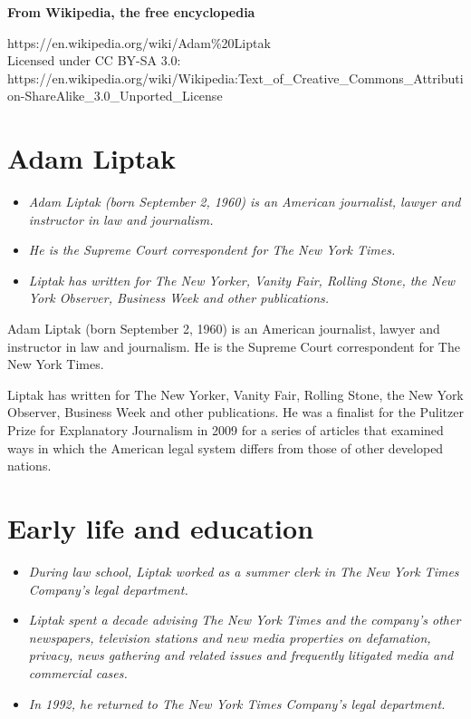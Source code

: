 \textbf{From Wikipedia, the free encyclopedia}

https://en.wikipedia.org/wiki/Adam\%20Liptak\\
Licensed under CC BY-SA 3.0:\\
https://en.wikipedia.org/wiki/Wikipedia:Text\_of\_Creative\_Commons\_Attribution-ShareAlike\_3.0\_Unported\_License

\section{Adam Liptak}\label{adam-liptak}

\begin{itemize}
\item
  \emph{Adam Liptak (born September 2, 1960) is an American journalist,
  lawyer and instructor in law and journalism.}
\item
  \emph{He is the Supreme Court correspondent for The New York Times.}
\item
  \emph{Liptak has written for The New Yorker, Vanity Fair, Rolling
  Stone, the New York Observer, Business Week and other publications.}
\end{itemize}

Adam Liptak (born September 2, 1960) is an American journalist, lawyer
and instructor in law and journalism. He is the Supreme Court
correspondent for The New York Times.

Liptak has written for The New Yorker, Vanity Fair, Rolling Stone, the
New York Observer, Business Week and other publications. He was a
finalist for the Pulitzer Prize for Explanatory Journalism in 2009 for a
series of articles that examined ways in which the American legal system
differs from those of other developed nations.

\section{Early life and education}\label{early-life-and-education}

\begin{itemize}
\item
  \emph{During law school, Liptak worked as a summer clerk in The New
  York Times Company's legal department.}
\item
  \emph{Liptak spent a decade advising The New York Times and the
  company's other newspapers, television stations and new media
  properties on defamation, privacy, news gathering and related issues
  and frequently litigated media and commercial cases.}
\item
  \emph{In 1992, he returned to The New York Times Company's legal
  department.}
\end{itemize}

